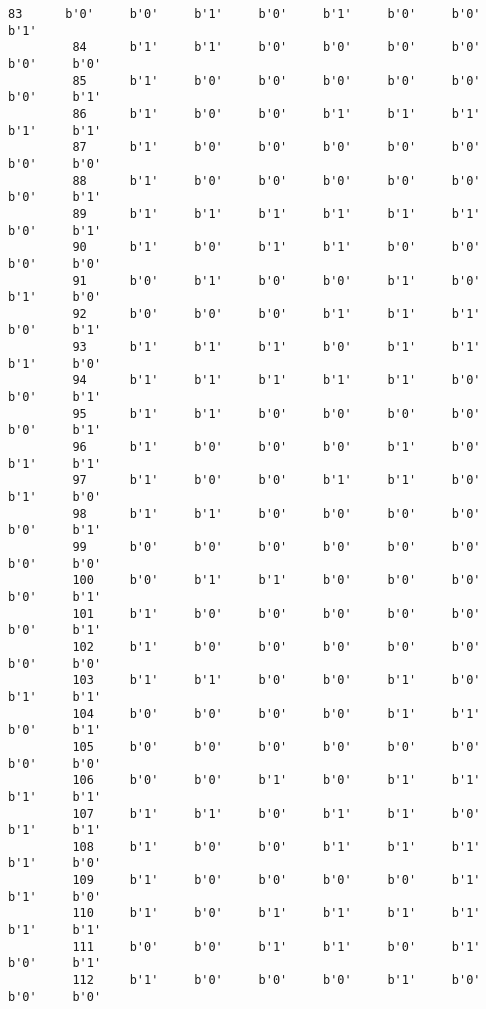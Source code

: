 \documentclass[11pt]{article}
\begin{document}
\begin{Verbatim}[commandchars=\\\{\}]
         83      b'0'     b'0'     b'1'     b'0'     b'1'     b'0'     b'0'     b'1'   
         84      b'1'     b'1'     b'0'     b'0'     b'0'     b'0'     b'0'     b'0'   
         85      b'1'     b'0'     b'0'     b'0'     b'0'     b'0'     b'0'     b'1'   
         86      b'1'     b'0'     b'0'     b'1'     b'1'     b'1'     b'1'     b'1'   
         87      b'1'     b'0'     b'0'     b'0'     b'0'     b'0'     b'0'     b'0'   
         88      b'1'     b'0'     b'0'     b'0'     b'0'     b'0'     b'0'     b'1'   
         89      b'1'     b'1'     b'1'     b'1'     b'1'     b'1'     b'0'     b'1'   
         90      b'1'     b'0'     b'1'     b'1'     b'0'     b'0'     b'0'     b'0'   
         91      b'0'     b'1'     b'0'     b'0'     b'1'     b'0'     b'1'     b'0'   
         92      b'0'     b'0'     b'0'     b'1'     b'1'     b'1'     b'0'     b'1'   
         93      b'1'     b'1'     b'1'     b'0'     b'1'     b'1'     b'1'     b'0'   
         94      b'1'     b'1'     b'1'     b'1'     b'1'     b'0'     b'0'     b'1'   
         95      b'1'     b'1'     b'0'     b'0'     b'0'     b'0'     b'0'     b'1'   
         96      b'1'     b'0'     b'0'     b'0'     b'1'     b'0'     b'1'     b'1'   
         97      b'1'     b'0'     b'0'     b'1'     b'1'     b'0'     b'1'     b'0'   
         98      b'1'     b'1'     b'0'     b'0'     b'0'     b'0'     b'0'     b'1'   
         99      b'0'     b'0'     b'0'     b'0'     b'0'     b'0'     b'0'     b'0'   
         100     b'0'     b'1'     b'1'     b'0'     b'0'     b'0'     b'0'     b'1'   
         101     b'1'     b'0'     b'0'     b'0'     b'0'     b'0'     b'0'     b'1'   
         102     b'1'     b'0'     b'0'     b'0'     b'0'     b'0'     b'0'     b'0'   
         103     b'1'     b'1'     b'0'     b'0'     b'1'     b'0'     b'1'     b'1'   
         104     b'0'     b'0'     b'0'     b'0'     b'1'     b'1'     b'0'     b'1'   
         105     b'0'     b'0'     b'0'     b'0'     b'0'     b'0'     b'0'     b'0'   
         106     b'0'     b'0'     b'1'     b'0'     b'1'     b'1'     b'1'     b'1'   
         107     b'1'     b'1'     b'0'     b'1'     b'1'     b'0'     b'1'     b'1'   
         108     b'1'     b'0'     b'0'     b'1'     b'1'     b'1'     b'1'     b'0'   
         109     b'1'     b'0'     b'0'     b'0'     b'0'     b'1'     b'1'     b'0'   
         110     b'1'     b'0'     b'1'     b'1'     b'1'     b'1'     b'1'     b'1'   
         111     b'0'     b'0'     b'1'     b'1'     b'0'     b'1'     b'0'     b'1'   
         112     b'1'     b'0'     b'0'     b'0'     b'1'     b'0'     b'0'     b'0'   

\end{Verbatim}
\end{document}
